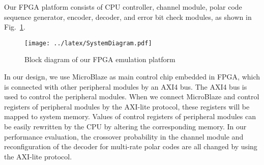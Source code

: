 \documentclass{article}
\begin{document}

Our FPGA platform consists of CPU controller, channel module, polar code sequence generator, encoder, decoder, and error bit check modules, as shown in Fig.~\ref{fig:sysD}.

\begin{figure}[htbp]
\centering
\texttt{[image: ../latex/SystemDiagram.pdf]}
\caption{Block diagram of our FPGA emulation platform}
\label{fig:sysD}
\end{figure}

In our design, we use MicroBlaze as main control chip embedded in FPGA, which is connected with other peripheral modules by an AXI4 bus. The AXI4 bus is used to control the peripheral modules. When we connect MicroBlaze and control registers of peripheral modules by the AXI-lite protocol, these registers will be mapped to system memory. Values of control registers of peripheral modules can be easily rewritten by the CPU by altering the corresponding memory. In our performance evaluation, the crossover probability in the channel module and reconfiguration of the decoder for multi-rate polar codes are all changed by using the AXI-lite protocol. 
\end{document}
